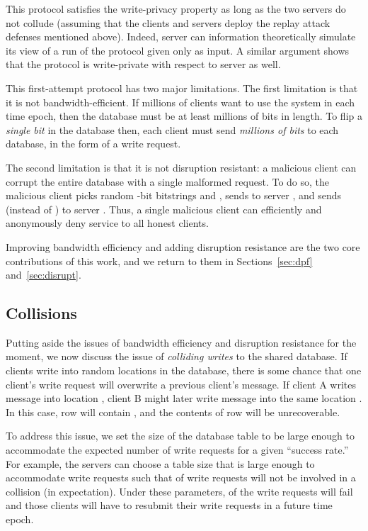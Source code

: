 \documentclass[10pt,twocolumn]{article}
\begin{document}
\medskip

This protocol satisfies the write-privacy property
as long as the two servers do not collude (assuming that the clients
and servers deploy the replay attack defenses mentioned above).
Indeed, server  can information theoretically simulate its view 
of a run of the protocol given only  as input.
A similar argument shows that the protocol is write-private with
respect to server  as well.

This first-attempt protocol has two major limitations.
The first limitation is that it is not bandwidth-efficient.
If millions of clients want to use the system in each time epoch, then 
the database must be at least millions of bits in length.
To flip a {\em single bit} in the database then, each client
must send {\em millions of bits} to each database,
in the form of a write request.

The second limitation is that it is not disruption resistant:
a malicious client can corrupt
the entire database with a single malformed request.
To do so, the malicious client picks random -bit bitstrings
 and , sends  to server , and sends  
(instead of ) to server .
Thus, a single malicious client can efficiently
and anonymously deny service to all honest clients.

Improving bandwidth efficiency and adding
disruption resistance are the two core contributions
of this work, and we return to them in Sections~\ref{sec:dpf}
and~\ref{sec:disrupt}.


\subsection{Collisions} \label{sec:collisions}
Putting aside the issues of bandwidth efficiency and
disruption resistance for the moment, we now discuss
the issue of {\em colliding writes} to the shared database.
If clients write into random locations in the database,
there is some chance that one client's write request
will overwrite a previous client's message.
If client A writes message  into location ,
client B might later write message  into the
same location .
In this case, row  will contain , 
and the contents of row  will be unrecoverable.

To address this issue,
we set the size of the database table to 
be large enough to accommodate the expected number 
of write requests for a given ``success rate.''
For example, the servers can choose a table size
that is large enough to accommodate  write requests
such that  of write requests
will not be involved in a collision (in expectation).
Under these parameters,  of the write
requests will fail and those clients will have to
resubmit their write requests in a future time epoch.
\end{document}
